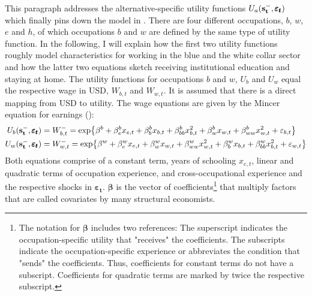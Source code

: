 \noindent
This paragraph addresses the alternative-specific utility functions $U_a(\bold{s_t^-}, \pmb{\varepsilon_t})$ which finally pins down the model in \cite{Keane.1994}. There are four different occupations, $b$, $w$, $e$ and $h$, of which occupations $b$ and $w$ are defined by the same type of utility function. In the following, I will explain how the first two utility functions roughly model characteristics for working in the blue and the white collar sector and how the latter two equations sketch receiving institutional education and staying at home. The utility functions for occupations $b$ and $w$, $U_b$ and $U_w$ equal the respective wage in USD, $W_{b,t}$ and $W_{w,t}$. It is assumed that there is a direct mapping from USD to utility. The wage equations are given by the Mincer equation for earnings (\cite{Mincer.1958}):
\begin{equation} \label{eq:returns_b_w}
\begin{aligned}
U_b(\bold{s_t^-}, \pmb{\varepsilon_t}) &= W_{b,t}^{-} = \text{exp}\big\{\beta^b + \beta_e^b x_{e,t} + \beta_b^b x_{b,t} + \beta_{bb}^b x^2_{b,t} + \beta_w^b x_{w,t} + \beta_{ww}^{b} x^2_{w,t} + \varepsilon_{b,t}\big\} \\
U_w(\bold{s_t^-},\pmb{\varepsilon_t}) &= W_{w,t}^{-} = \text{exp}\big\{\beta^w + \beta_e^w x_{e,t} + \beta_w^w x_{w,t} + \beta_{ww}^w x^2_{w,t} + \beta_b^w x_{b,t} + \beta_{bb}^{w} x^2_{b,t} + \varepsilon_{w,t}\big\}
\end{aligned}
\end{equation}
Both equations comprise of a constant term, years of schooling $x_{e,t}$, linear and quadratic terms of occupation experience, and cross-occupational experience and the  respective shocks in $\pmb{\varepsilon_t}$. $\pmb{\beta}$ is the vector of coefficients\footnote{The notation for $\pmb{\beta}$ includes two references: The superscript indicates the occupation-specific utility that "receives" the coefficients. The subscripts indicate the occupation-specific experience or abbreviates the condition that "sends" the coefficients. Thus, coefficients for constant terms do not have a subscript. Coefficients for quadratic terms are marked by twice the respective subscript.} that multiply factors that are called covariates by many structural economists.

